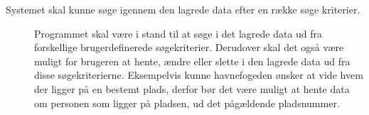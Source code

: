 \begin{description}
    \item[Systemet skal kunne søge igennem den lagrede data efter en række søge kriterier.]\hfill

Programmet skal være i stand til at søge i det lagrede data ud fra forskellige brugerdefinerede søgekriterier. Derudover skal det også være muligt for brugeren at hente, ændre eller slette i den lagrede data ud fra disse søgekriterierne. Eksempelvis kunne havnefogeden ønsker at vide hvem der ligger på en bestemt plads, derfor bør det være muligt at hente data om personen som ligger på pladsen, ud det pågældende pladsnummer.

\end{description}
